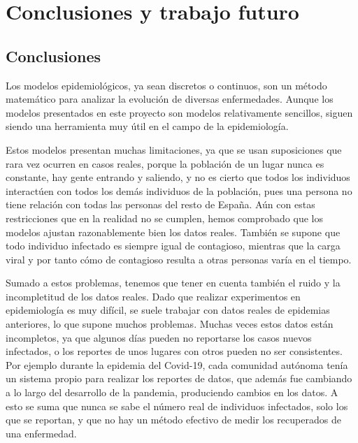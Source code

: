 
\chapter{Conclusiones y trabajo futuro}

\section{Conclusiones}

Los modelos epidemiológicos, ya sean discretos o continuos, son un método matemático para analizar la evolución de diversas enfermedades. Aunque los modelos presentados en este proyecto son modelos relativamente sencillos, siguen siendo una herramienta muy útil en el campo de la epidemiología.

Estos modelos presentan muchas limitaciones, ya que se usan suposiciones que rara vez ocurren en casos reales, porque la población de un lugar nunca es constante, hay gente entrando y saliendo, y no es cierto que todos los individuos interactúen con todos los demás individuos de la población, pues una persona no tiene relación con todas las personas del resto de España. Aún con estas restricciones que en la realidad no se cumplen, hemos comprobado que los modelos ajustan razonablemente bien los datos reales. También se supone que todo individuo infectado es siempre igual de contagioso, mientras que la carga viral y por tanto cómo de contagioso resulta a otras personas varía en el tiempo.

Sumado a estos problemas, tenemos que tener en cuenta también el ruido y la incompletitud de los datos reales. Dado que realizar experimentos en epidemiología es muy difícil, se suele trabajar con datos reales de epidemias anteriores, lo que supone muchos problemas. Muchas veces estos datos están incompletos, ya que algunos días pueden no reportarse los casos nuevos infectados, o los reportes de unos lugares con otros pueden no ser consistentes. Por ejemplo durante la epidemia del Covid-19, cada comunidad autónoma tenía un sistema propio para realizar los reportes de datos, que además fue cambiando a lo largo del desarrollo de la pandemia, produciendo cambios en los datos. A esto se suma que nunca se sabe el número real de individuos infectados, solo los que se reportan, y que no hay un método efectivo de medir los recuperados de una enfermedad.

